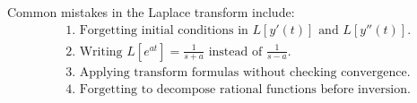 \begin{conceptbox}
    Common mistakes in the Laplace transform include:
    \[
        \begin{aligned}
             & \text{1. Forgetting initial conditions in } L[y'(t)] \text{ and } L[y''(t)].  \\
             & \text{2. Writing } L[e^{at}]=\frac{1}{s+a} \text{ instead of } \frac{1}{s-a}. \\
             & \text{3. Applying transform formulas without checking convergence.}           \\
             & \text{4. Forgetting to decompose rational functions before inversion.}
        \end{aligned}
    \]
\end{conceptbox}